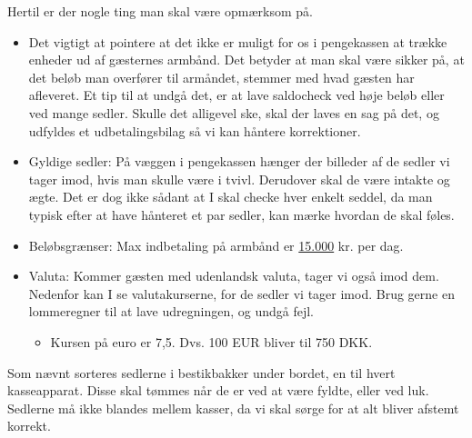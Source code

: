 Hertil er der nogle ting man skal være opmærksom på.
\begin{itemize}
  \item Det vigtigt at pointere at det ikke er muligt for 
  os i pengekassen at trække enheder ud af gæsternes armbånd.
  Det betyder at man skal være sikker på, at det beløb man overfører til armåndet, 
  stemmer med hvad gæsten har afleveret. Et tip til at undgå det, er
  at lave saldocheck ved høje beløb eller ved mange sedler.
  Skulle det alligevel ske, skal der laves en sag på det, og udfyldes et
  udbetalingsbilag så vi kan håntere korrektioner.
  \item Gyldige sedler: På væggen i pengekassen hænger der billeder af de sedler vi tager imod, 
  hvis man skulle være i tvivl. Derudover skal de være intakte og ægte. 
  Det er dog ikke sådant at I skal checke hver enkelt seddel, da man typisk efter at have 
  hånteret et par sedler, kan mærke hvordan de skal føles.
  \item Beløbsgrænser: Max indbetaling på armbånd er \underline{15.000} kr. per dag.
  \item Valuta: Kommer gæsten med udenlandsk valuta, tager vi også imod dem. Nedenfor 
  kan I se valutakurserne, for de sedler vi tager imod. Brug gerne en lommeregner til 
  at lave udregningen, og undgå fejl.
  \begin{itemize}
    \item Kursen på euro er 7,5. Dvs. 100 EUR bliver til 750 DKK.
  \end{itemize}
\end{itemize}

Som nævnt sorteres sedlerne i bestikbakker under bordet, en til hvert kasseapparat. 
Disse skal tømmes når de er ved at være fyldte, eller ved luk. Sedlerne må ikke blandes mellem kasser, 
da vi skal sørge for at alt bliver afstemt korrekt.

